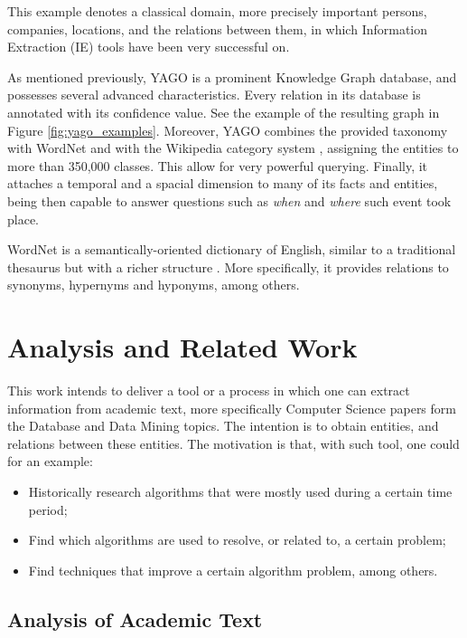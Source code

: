 \documentclass[11pt,a4paper,openright]{memoir}
\begin{document}
This example denotes a classical domain, more precisely important persons, companies, locations, and the relations between them, in which Information Extraction (IE) tools have been very successful on.

As mentioned previously, YAGO \cite{Suchanek2007} is a prominent Knowledge Graph database, and possesses several advanced characteristics. Every relation in its database is annotated with its confidence value. See the example of the resulting graph in Figure \ref{fig:yago_examples}. Moreover, YAGO combines the provided taxonomy with WordNet \cite{Miller:1995:WLD:219717.219748} and with the Wikipedia category system \cite{wiki}, assigning the entities to more than 350,000 classes. This allow for very powerful querying. Finally, it attaches a temporal and a spacial dimension to many of its facts and entities, being then capable to answer questions such as \emph{when} and \emph{where} such event took place.

WordNet is a semantically-oriented dictionary of English, similar to a traditional thesaurus but with a richer structure \cite{BirdKleinLoper09}. More specifically, it provides relations to synonyms, hypernyms and hyponyms, among others.


%
%
%
%


\chapter{Analysis and Related Work}
\label{chapter:analysis}

This work intends to deliver a tool or a process in which one can extract information from academic text, more specifically Computer Science papers form the Database and Data Mining topics. The intention is to obtain entities, and relations between these entities. The motivation is that, with such tool, one could for an example:
\begin{itemize}
	\item Historically research algorithms that were mostly used during a certain time period;
	\item Find which algorithms are used to resolve, or related to, a certain problem;
	\item Find techniques that improve a certain algorithm problem, among others.
\end{itemize}

\section{Analysis of Academic Text}
\label{section:analysis_of_academic_text}
\end{document}
